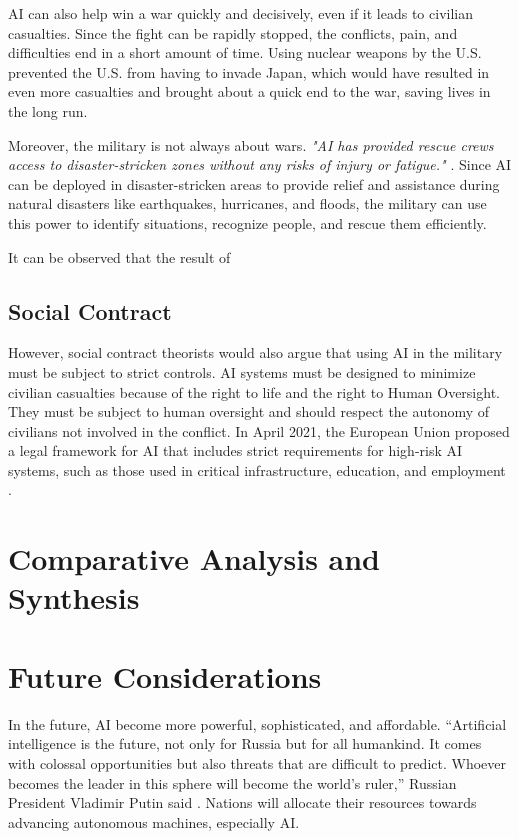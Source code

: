 \documentclass{article}
\begin{document}
AI can also help win a war quickly and decisively, even if it leads to civilian casualties. Since the fight can be rapidly stopped, the conflicts, pain, and difficulties end in a short amount of time. Using nuclear weapons by the U.S. prevented the U.S. from having to invade Japan, which would have resulted in even more casualties and brought about a quick end to the war, saving lives in the long run.

Moreover, the military is not always about wars. \textit{"AI has provided rescue crews access to disaster-stricken zones without any risks of injury or fatigue."} \cite{Sud2020}. Since AI can be deployed in disaster-stricken areas to provide relief and assistance during natural disasters like earthquakes, hurricanes, and floods, the military can use this power to identify situations, recognize people, and rescue them efficiently.

It can be observed that the result of

\subsection{Social Contract}

However, social contract theorists would also argue that using AI in the military must be subject to strict controls. AI systems must be designed to minimize civilian casualties because of the right to life and the right to Human Oversight. They must be subject to human oversight and should respect the autonomy of civilians not involved in the conflict. In April 2021, the European Union proposed a legal framework for AI that includes strict requirements for high-risk AI systems, such as those used in critical infrastructure, education, and employment \cite{unknown-author-2023}.

\section{Comparative Analysis and Synthesis}

\section{Future Considerations}
In the future, AI become more powerful, sophisticated, and affordable. “Artificial intelligence is the future, not only for Russia but for all humankind. It comes with colossal opportunities but also threats that are difficult to predict. Whoever becomes the leader in this sphere will become the world's ruler,” Russian President Vladimir Putin said \cite{rt-2017}. Nations will allocate their resources towards advancing autonomous machines, especially AI. 
\end{document}
